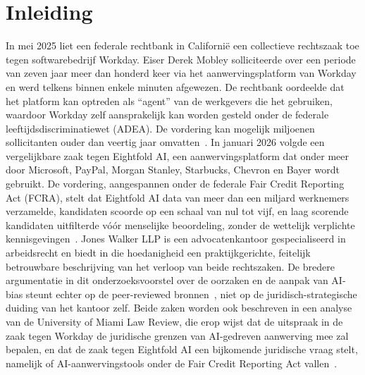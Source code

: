 \documentclass{hogent-article}
\begin{document}
\tableofcontents

\section{Inleiding}%
\label{sec:inleiding}

In mei 2025 liet een federale rechtbank in Californië een collectieve
rechtszaak toe tegen softwarebedrijf Workday. Eiser Derek Mobley
solliciteerde over een periode van zeven jaar meer dan honderd keer via het
aanwervingsplatform van Workday en werd telkens binnen enkele minuten
afgewezen. De rechtbank oordeelde dat het platform kan optreden als ``agent''
van de werkgevers die het gebruiken, waardoor Workday zelf aansprakelijk kan
worden gesteld onder de federale leeftijdsdiscriminatiewet (ADEA). De
vordering kan mogelijk miljoenen sollicitanten ouder dan veertig jaar
omvatten~\autocite{JonesWalker2026}. In januari 2026 volgde een vergelijkbare
zaak tegen Eightfold AI, een aanwervingsplatform dat onder meer door
Microsoft, PayPal, Morgan Stanley, Starbucks, Chevron en Bayer wordt
gebruikt. De vordering, aangespannen onder de federale Fair Credit Reporting
Act (FCRA), stelt dat Eightfold AI data van meer dan een miljard werknemers
verzamelde, kandidaten scoorde op een schaal van nul tot vijf, en laag
scorende kandidaten uitfilterde vóór menselijke beoordeling, zonder de
wettelijk verplichte kennisgevingen~\autocite{JonesWalker2026}. Jones
Walker LLP is een advocatenkantoor gespecialiseerd in arbeidsrecht en biedt
in die hoedanigheid een praktijkgerichte, feitelijk betrouwbare beschrijving
van het verloop van beide rechtszaken. De bredere argumentatie in dit
onderzoeksvoorstel over de oorzaken en de aanpak van AI-bias steunt echter
op de peer-reviewed bronnen~\autocite{Fabris2025,Chen2023}, niet op de
juridisch-strategische duiding van het kantoor zelf. Beide zaken worden ook
beschreven in een analyse van de University of Miami Law Review, die erop
wijst dat de uitspraak in de zaak tegen Workday de juridische grenzen van
AI-gedreven aanwerving mee zal bepalen, en dat de zaak tegen Eightfold AI
een bijkomende juridische vraag stelt, namelijk of AI-aanwervingstools
onder de Fair Credit Reporting Act vallen~\autocite{Adams2026}.
\end{document}
